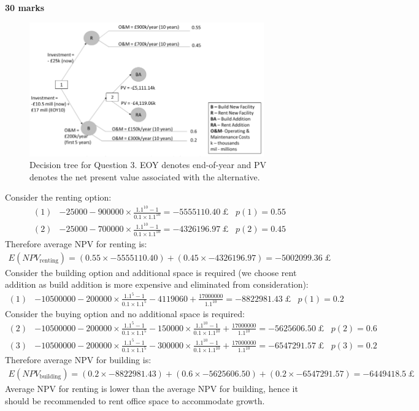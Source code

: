 \textbf{30 marks}
\begin{figure}[H]
    \centering
    \includegraphics[width = 0.9\textwidth]{img/figure68.png}
    \caption{Decision tree for Question 3. EOY denotes end-of-year and PV denotes the net present value associated with the alternative.}
    \label{fig:dt2}
\end{figure}
Consider the renting option:
\begin{align}
    (1) & -25000-900000\times \frac{1.1^10-1}{0.1\times 1.1^10} = \SI{-5555110.40}{\pounds} & p(1) = 0.55 \\
    (2) & -25000-700000\times \frac{1.1^10-1}{0.1\times 1.1^10} = \SI{-4326196.97}{\pounds} & p(2) = 0.45
\end{align}
Therefore average NPV for renting is:
\begin{gather}
    E(NPV_{\textrm{renting}}) = \left(0.55\times-5555110.40\right) + \left(0.45\times-4326196.97\right) = \SI{-5002099.36}{\pounds}
\end{gather}
Consider the building option and additional space is required (we choose rent addition as build addition is more expensive and eliminated from consideration):
\begin{align}
    (1) & -10500000 - 200000\times \frac{1.1^5-1}{0.1\times 1.1^5} -4119060 +\frac{17000000}{1.1^{10}} = \SI{-8822981.43}{\pounds} & p(1) = 0.2
\end{align}
Consider the buying option and no additional space is required:
\begin{align}
    (2) & -10500000 - 200000\times \frac{1.1^5-1}{0.1\times 1.1^5} - 150000\times \frac{1.1^{10} - 1}{0.1\times 1.1^{10}} +\frac{17000000}{1.1^{10}} = \SI{-5625606.50}{\pounds} & p(2) = 0.6 \\
    (3) & -10500000 - 200000\times \frac{1.1^5-1}{0.1\times 1.1^5} - 300000\times \frac{1.1^{10} - 1}{0.1\times 1.1^{10}} +\frac{17000000}{1.1^{10}} = \SI{-6547291.57}{\pounds} & p(3) = 0.2
\end{align}
Therefore average NPV for building is:
\begin{multline}
    E(NPV_{\textrm{building}}) = \left(0.2\times-8822981.43\right) + \left(0.6\times-5625606.50\right) + \left(0.2\times-6547291.57\right) = \SI{-6449418.5}{\pounds}
\end{multline}
Average NPV for renting is lower than the average NPV for building, hence it should be recommended to rent office space to accommodate growth.
